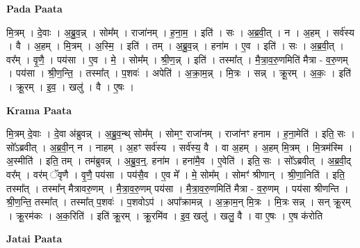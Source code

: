 \documentclass[17pt]{extarticle}
\begin{document}
\textbf{Pada Paata} \newline

मि॒त्रम् । दे॒वाः । अ॒ब्रु॒व॒न्न् । सोम᳚म् । राजा॑नम् । ह॒ना॒म॒ । इति॑ । सः । अ॒ब्र॒वी॒त् । न । अ॒हम् । सर्व॑स्य । वै । अ॒हम् । मि॒त्रम् । अ॒स्मि॒ । इति॑ । तम् । अ॒ब्रु॒व॒न्न् । हना॑म । ए॒व । इति॑ । सः । अ॒ब्र॒वी॒त् । वर᳚म् । वृ॒णै॒ । पय॑सा । ए॒व । मे॒ । सोम᳚म् । श्री॒ण॒न्न् । इति॑ । तस्मा᳚त् । मै॒त्रा॒व॒रु॒णमिति॑ मैत्रा - व॒रु॒णम् । पय॑सा । श्री॒ण॒न्ति॒ । तस्मा᳚त् । प॒शवः॑ । अपेति॑ । अ॒क्रा॒म॒न्न् । मि॒त्रः । सन्न् । क्रू॒रम् । अ॒कः॒ । इति॑ । क्रू॒रम् । इ॒व॒ । खलु॑ । वै । ए॒षः ।  \newline


\textbf{Krama Paata} \newline

मि॒त्रम् दे॒वाः । दे॒वा अ॑ब्रुवन्न् । अ॒ब्रु॒व॒न्थ् सोम᳚म् । सोमꣳ॒॒ राजा॑नम् । राजा॑नꣳ हनाम । ह॒ना॒मेति॑ । इति॒ सः । सो᳚ऽब्रवीत् । अ॒ब्र॒वी॒न् न । नाहम् । अ॒हꣳ सर्व॑स्य । सर्व॑स्य॒ वै । वा अ॒हम् । अ॒हम् मि॒त्रम् । मि॒त्रम॑स्मि । अ॒स्मीति॑ । इति॒ तम् । तम॑ब्रुवन्न् । अ॒ब्रु॒व॒न्॒. हना॑म । हना॑मै॒व । ए॒वेति॑ । इति॒ सः । सो᳚ऽब्रवीत् । अ॒ब्र॒वी॒द् वर᳚म् । वर॑म् ॅवृणै । वृ॒णै॒ पय॑सा । पय॑सै॒व । ए॒व मे᳚ । मे॒ सोम᳚म् । सोमꣳ॑ श्रीणान् । श्री॒णा॒निति॑ । इति॒ तस्मा᳚त् । तस्मा᳚न् मैत्रावरु॒णम् । मै॒त्रा॒व॒रु॒णम् पय॑सा । मै॒त्रा॒व॒रु॒णमिति॑ मैत्रा - व॒रु॒णम् । पय॑सा श्रीणन्ति । श्री॒ण॒न्ति॒ तस्मा᳚त् । तस्मा᳚त् प॒शवः॑ । प॒शवोऽप॑ । अपा᳚क्रामन्न् । अ॒क्रा॒म॒न् मि॒त्रः । मि॒त्रः सन्न् । सन् क्रू॒रम् । क्रू॒रम॑कः । अ॒क॒रिति॑ । इति॑ क्रू॒रम् । क्रू॒रमि॑व । इ॒व॒ खलु॑ । खलु॒ वै । वा ए॒षः । ए॒ष क॑रोति \newline

\textbf{Jatai Paata} \newline
\end{document}
